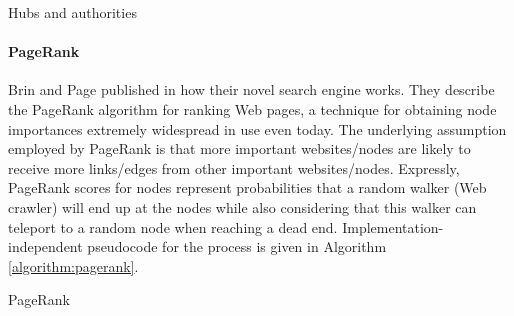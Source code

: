\begin{algorithm}[H]
\caption{Hubs and authorities}
\label{algorithm:hits}
\begin{algorithmic}
\ENDWHILE
{}
\end{algorithmic}
\end{algorithm}

\paragraph{PageRank} Brin and Page published in \cite{brin_anatomy_1998} how their novel search engine works. They describe the PageRank algorithm for ranking Web pages, a technique for obtaining node importances extremely widespread in use even today. The underlying assumption employed by PageRank is that more important websites/nodes are likely to receive more links/edges from other important websites/nodes. Expressly, PageRank scores for nodes represent probabilities that a random walker (Web crawler) will end up at the nodes while also considering that this walker can teleport to a random node when reaching a dead end. Implementation-independent pseudocode for the process is given in Algorithm \ref{algorithm:pagerank}.

\begin{algorithm}[H]
\caption{PageRank}
\label{algorithm:pagerank}
\begin{algorithmic}
\end{algorithmic}
\end{algorithm}

